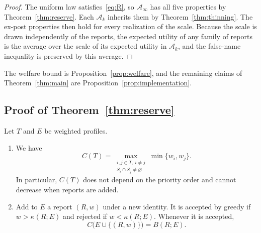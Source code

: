 \documentclass[format=acmsmall, review=false]{acmart}
\begin{document}
\begin{proof}
The uniform law satisfies~\eqref{eq:R}, so \(\mathcal A_\infty\)
has all five properties by Theorem~\ref{thm:reserve}. Each
\(\mathcal A_k\) inherits them by Theorem~\ref{thm:thinning}.
The ex-post properties then hold for every realization of the
scale. Because the scale is drawn independently of the reports,
the expected utility of any family of reports is the average
over the scale of its expected utility in \(\mathcal A_k\), and
the false-name inequality is preserved by this average.
\end{proof}

The welfare bound is Proposition~\ref{prop:welfare}, and the
remaining claims of Theorem~\ref{thm:main} are
Proposition~\ref{prop:implementation}.

\subsection{Proof of Theorem~\ref{thm:reserve}}
\label{sec:rand-reserve-proof}

\begin{lemma}
\label{lem:greedy}
Let \(T\) and \(E\) be weighted profiles.
\begin{enumerate}
\item[(a)] We have
\begin{equation}\label{eq:pair}
C(T)=
\max_{\substack{i,j\in T,\ i\ne j\\
                 S_i\cap S_j\ne\varnothing}}
\min\{w_i,w_j\}.
\end{equation}
In particular, \(C(T)\) does not depend on the priority order and
cannot decrease when reports are added.
\item[(b)] Add to \(E\) a report \((R,w)\) under a new identity.
It is accepted by greedy if \(w>\kappa(R;E)\) and rejected if
\(w<\kappa(R;E)\). Whenever it is accepted,
\begin{equation}\label{eq:normalizer}
C\bigl(E\cup\{(R,w)\}\bigr)=B(R;E).
\end{equation}
\end{enumerate}
\end{lemma}
\end{document}

